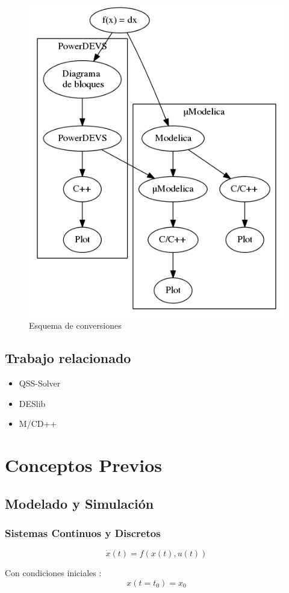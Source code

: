 \documentclass{beamer}
\begin{document}
\begin{frame}
\begin{figure}[H]
\centering
 \includegraphics[width=0.50\linewidth]{esquema}
 \caption{Esquema de conversiones}
 \label{fig:esquema}
\end{figure}
\end{frame}

\section{Trabajo relacionado}
\begin{frame}
\begin{itemize}
	\item QSS-Solver
	\item DESlib
	\item M/CD++ 
\end{itemize}
\end{frame}

\chapter{Conceptos Previos}
\section{Modelado y Simulación}
\subsection{Sistemas Continuos y Discretos}
\begin{frame}
	\begin{equation} \label{eq:eq1}
	\dot{x}(t) = f (x(t), u(t))
	\end{equation}

	Con condiciones iniciales :
	\begin{equation} \label{eq:eq2}
	x(t = t_0 ) = x_0
	\end{equation}
\end{frame}
\end{document}
